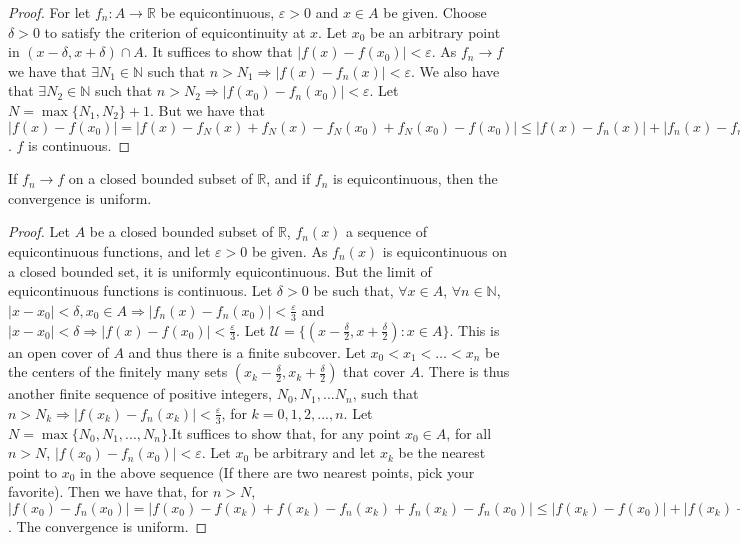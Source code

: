 \documentclass[crop=false,class=book]{standalone}
\begin{document}
\begin{proof}
For let $f_n:A\rightarrow \mathbb{R}$ be equicontinuous, $\varepsilon>0$ and $x\in A$ be given. Choose $\delta>0$ to satisfy the criterion of equicontinuity at $x$. Let $x_0$ be an arbitrary point in $(x-\delta,x+\delta)\cap A$. It suffices to show that $|f(x) - f(x_0)|<\varepsilon$. As $f_n \rightarrow f$ we have that $\exists N_1 \in\mathbb{N}$ such that $n>N_1\Rightarrow |f(x) - f_n(x)|<\varepsilon$. We also have that $\exists N_2 \in \mathbb{N}$ such that $n>N_2 \Rightarrow |f(x_0)-f_n(x_0)|<\varepsilon$. Let $N=\max\{N_1,N_2\}+1$. But we have that $|f(x) - f(x_0)| = |f(x) - f_N(x) + f_N(x)-f_N(x_0) + f_N(x_0) - f(x_0)|\leq |f(x) - f_n(x)| + |f_n(x)-f_n(x_0)| + |f_n(x_0) - f(x_0)| < 3\varepsilon$. $f$ is continuous.
\end{proof}
\begin{theorem}
If $f_n \rightarrow f$ on a closed bounded subset of $\mathbb{R}$, and if $f_n$ is equicontinuous, then the convergence is uniform.
\end{theorem}
\begin{proof}
Let $A$ be a closed bounded subset of $\mathbb{R}$, $f_n(x)$ a sequence of equicontinuous functions, and let $\varepsilon>0$ be given. As $f_n(x)$ is equicontinuous on a closed bounded set, it is uniformly equicontinuous. But the limit of equicontinuous functions is continuous. Let $\delta>0$ be such that, $\forall x\in A$, $\forall n\in\mathbb{N}$, $|x-x_0|<\delta, x_0\in A \Rightarrow |f_n(x)-f_n(x_0)|<\frac{\varepsilon}{3}$ and $|x-x_0|<\delta \Rightarrow |f(x)-f(x_0)|<\frac{\varepsilon}{3}$. Let $\mathcal{U} = \{(x-\frac{\delta}{2},x+\frac{\delta}{2}): x\in A\}$. This is an open cover of $A$ and thus there is a finite subcover. Let $x_0<x_1<\hdots<x_n$ be the centers of the finitely many sets $(x_k-\frac{\delta}{2},x_k+\frac{\delta}{2})$ that cover $A$. There is thus another finite sequence of positive integers, $N_0, N_1,... N_n$, such that $n>N_k \Rightarrow |f(x_k)-f_n(x_k)|<\frac{\varepsilon}{3}$, for $k=0,1,2,...,n$. Let $N= \max\{N_0, N_1, ..., N_n\}$.It suffices to show that, for any point $x_0 \in A$, for all $n>N$, $|f(x_0)-f_n(x_0)|<\varepsilon$. Let $x_0$ be arbitrary and let $x_k$ be the nearest point to $x_0$ in the above sequence (If there are two nearest points, pick your favorite). Then we have that, for $n>N$, $|f(x_0) - f_n(x_0)| = |f(x_0)-f(x_k)+f(x_k)-f_n(x_k)+f_n(x_k)-f_n(x_0)|\leq |f(x_k)-f(x_0)|+|f(x_k)-f_n(x_k)|+|f_n(x_k)-f_n(x_0)|<\varepsilon$. The convergence is uniform.
\end{proof}
\end{document}
